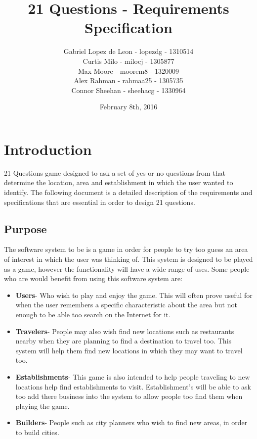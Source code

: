 \documentclass[titlepage]{article}
\title{\textbf{21 Questions - Requirements Specification}}
\author{Gabriel Lopez de Leon - lopezdg - 1310514\\Curtis Milo - milocj - 1305877\\Max Moore - moorem8 - 1320009\\Alex Rahman - rahmaa25 - 1305735\\Connor Sheehan - sheehacg - 1330964}
\date{February 8th, 2016}
\begin{document}
	
	\maketitle
	\vspace{4cm}	
		\newpage
		\tableofcontents
		\newpage
		\section{Introduction}
		\label{sec:introduction}
		
		21 Questions game designed to ask a set of yes or no questions from that determine the location, area and establishment in which the user wanted to identify. The following document is a detailed description of the requirements and specifications that are essential in order to design 21 questions.
		
		\subsection{Purpose}
		\label{sub:purpose}
		
		
		The software system to be is a game in order for people to try too guess an area of interest in which the user was thinking of. This system is designed to be played as a game, however the functionality will have a wide range of uses. Some people who are would benefit from using this software system are:
		
		\begin{itemize}
			
			\item \textbf{Users}- Who wish to play and enjoy the game. This will often prove useful for when the user remembers a specific characteristic about the area but not enough to be able too search on the Internet for it. 
			\item \textbf{Travelers}- People may also wish find new locations such as restaurants nearby when they are planning to find a destination to travel too. This system will help them find new locations in which they may want to travel too.
			\item \textbf{Establishments}- This game is also intended to help people traveling to new locations help find establishments to visit. Establishment's will be able to ask too add there business into the system to allow people too find them when playing the game.
			\item \textbf{Builders}- People such as city planners who wish to find new areas, in order to build cities.
			
		\end{itemize}
		
\end{document}
